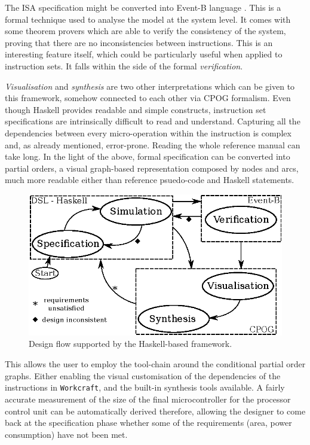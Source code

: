 \documentclass[conference]{IEEEtran}
\begin{document}
The ISA specification might be converted into Event-B language \cite{eventB}. This is a
formal technique used to analyse the model at the system level. It comes with some theorem
provers which are able to verify the consistency of the system, proving that there are 
no inconsistencies between instructions. This is an interesting feature itself, which could
be particularly useful when applied to instruction sets. It falls within the side of the
formal \textit{verification}.

\textit{Visualisation} and \textit{synthesis} are two other
interpretations which can be given to this framework, somehow connected to each other via
CPOG formalism. Even though Haskell provides readable and simple constructs, instruction
set specifications are intrinsically difficult to read and understand.
Capturing all the dependencies between every micro-operation within the instruction is
complex and, as already mentioned, error-prone. Reading the whole reference manual can take
long. In the light of the above, formal specification can be converted into partial orders,
a visual graph-based representation composed by nodes and arcs, much more readable either
than reference psuedo-code and Haskell statements.

\begin{figure}[ht!]
\begin{center}
	\includegraphics[width=\linewidth]{IMG/flow.eps}
	\caption{Design flow supported by the Haskell-based framework.}
	\label{fig:flow}
\end{center}
\end{figure}

This allows the user to employ the tool-chain around the conditional partial order
graphs. Either enabling the visual customisation of the dependencies of the instructions in 
\verb|Workcraft|, and the built-in synthesis tools available. A fairly
accurate measurement of the size of the final microcontroller for the processor control
unit can be automatically derived therefore, allowing the designer to come back at the
specification phase whether some of the requirements (area, power consumption) have not been
met.
\end{document}

